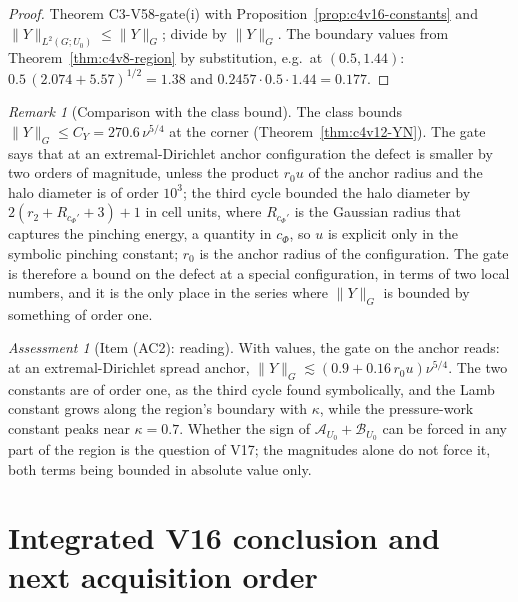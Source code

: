 \documentclass[11pt]{article}
\theoremstyle{plain}
\theoremstyle{definition}
\theoremstyle{remark}
\newtheorem{remark}[theorem]{Remark}
\newtheorem{assessment}[theorem]{Assessment}
\begin{document}
\begin{proof}
Theorem C3-V58-gate(i) with Proposition~\ref{prop:c4v16-constants} and
\(\|Y\|_{L^2(G;U_0)}\le\|Y\|_G\); divide by \(\|Y\|_G\).  The boundary values from
Theorem~\ref{thm:c4v8-region} by substitution, e.g.\ at \((0.5,1.44)\):
\(0.5\,(2.074+5.57)^{1/2}=1.38\) and \(0.2457\cdot0.5\cdot1.44=0.177\).
\end{proof}

\begin{remark}[Comparison with the class bound]
\label{rem:c4v16-comparison}
The class bounds \(\|Y\|_G\le C_Y=270.6\,\nu^{5/4}\) at the corner (Theorem~\ref{thm:c4v12-YN}).
The gate says that at an extremal-Dirichlet anchor configuration the
defect is smaller by two orders of magnitude, unless the product
\(r_0u\) of the anchor radius and the halo diameter is of order \(10^3\); the
third cycle bounded the halo diameter by \(2(r_2+R_{c_\Phi'}+3)+1\) in cell units,
where \(R_{c_\Phi'}\) is the Gaussian radius that captures the pinching
energy, a quantity in \(c_\Phi\), so \(u\) is explicit only in the symbolic
pinching constant; \(r_0\) is the anchor radius of the configuration.
The gate is therefore a bound on the defect at a special
configuration, in terms of two local numbers, and it is the only
place in the series where \(\|Y\|_G\) is bounded by something of order
one.
\end{remark}

\begin{assessment}[Item (AC2): reading]
\label{ass:c4v16-reading}
With values, the gate on the anchor reads: at an extremal-Dirichlet
spread anchor, \(\|Y\|_G\lesssim(0.9+0.16\,r_0u)\nu^{5/4}\).  The two constants are of
order one, as the third cycle found symbolically, and the Lamb
constant grows along the region's boundary with \(\kappa\), while the
pressure-work constant peaks near \(\kappa=0.7\).  Whether the sign of
\(\mathcal A_{U_0}+\mathcal B_{U_0}\) can be forced in any part of the region is the question
of V17; the magnitudes alone do not force it, both terms being
bounded in absolute value only.
\end{assessment}

\section{Integrated V16 conclusion and next acquisition order}
\label{sec:c4v16-conclusion}
\end{document}
